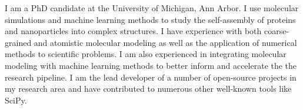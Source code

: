 \begin{cvparagraph}

I am a PhD candidate at the University of Michigan, Ann Arbor.
I use molecular simulations and machine learning methods to study the self-assembly of proteins and nanoparticles into complex structures.
I have experience with both coarse-grained and atomistic molecular modeling as well as the application of numerical methods to scientific problems.
I am also experienced in integrating molecular modeling with machine learning methods to better inform and accelerate the the research pipeline.
I am the lead developer of a number of open-source projects in my research area and have contributed to numerous other well-known tools like SciPy.
\end{cvparagraph}
